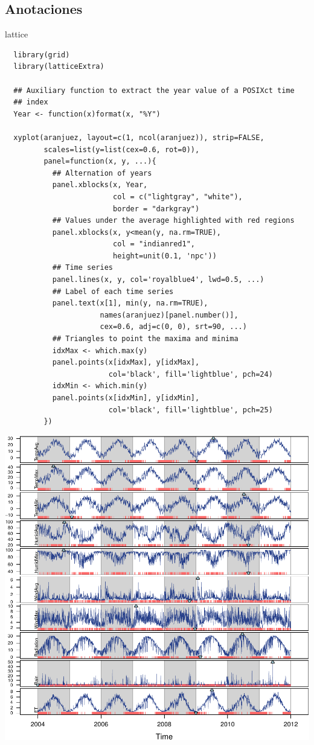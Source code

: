 \documentclass[xcolor={usenames,svgnames,dvipsnames}]{beamer}
\begin{document}
\subsection{Anotaciones}
\label{sec-2-2}
\begin{frame}[fragile,label=sec-2-2-1]{lattice}
 \lstset{language=R,label= ,caption= ,numbers=none}
\begin{lstlisting}
  library(grid)
  library(latticeExtra)
  
  ## Auxiliary function to extract the year value of a POSIXct time
  ## index
  Year <- function(x)format(x, "%Y")
  
  xyplot(aranjuez, layout=c(1, ncol(aranjuez)), strip=FALSE,
         scales=list(y=list(cex=0.6, rot=0)),
         panel=function(x, y, ...){
           ## Alternation of years
           panel.xblocks(x, Year,
                         col = c("lightgray", "white"),
                         border = "darkgray")
           ## Values under the average highlighted with red regions
           panel.xblocks(x, y<mean(y, na.rm=TRUE),
                         col = "indianred1",
                         height=unit(0.1, 'npc'))
           ## Time series
           panel.lines(x, y, col='royalblue4', lwd=0.5, ...)
           ## Label of each time series
           panel.text(x[1], min(y, na.rm=TRUE),
                      names(aranjuez)[panel.number()],
                      cex=0.6, adj=c(0, 0), srt=90, ...)
           ## Triangles to point the maxima and minima 
           idxMax <- which.max(y)
           panel.points(x[idxMax], y[idxMax],
                        col='black', fill='lightblue', pch=24)
           idxMin <- which.min(y)
           panel.points(x[idxMin], y[idxMin],
                        col='black', fill='lightblue', pch=25)
         })
\end{lstlisting}
\end{frame}

\begin{frame}[label=sec-2-2-2]{}
\includegraphics[width=.9\linewidth]{figs/aranjuezXblocks.pdf}
\end{frame}
\end{document}
